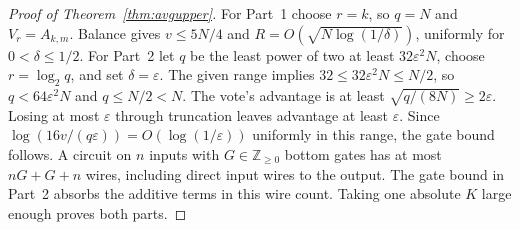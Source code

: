 \documentclass[11pt]{article}
\begin{document}
\begin{proof}[Proof of Theorem~\ref{thm:avgupper}]
For Part~1 choose $r=k$, so $q=N$ and $V_r=A_{k,m}$.
Balance gives $v\le5N/4$ and
$R=O(\sqrt{N\log(1/\delta)})$, uniformly for $0<\delta\le1/2$.
For Part~2 let $q$ be the least power of two at least
$32\varepsilon^2N$, choose $r=\log_2q$, and set $\delta=\varepsilon$.
The given range implies $32\le32\varepsilon^2N\le N/2$, so
$q<64\varepsilon^2N$ and $q\le N/2<N$.
The vote's advantage is at least $\sqrt{q/(8N)}\ge2\varepsilon$.
Losing at most $\varepsilon$ through truncation leaves advantage at least
$\varepsilon$. Since
$\log(16v/(q\varepsilon))=O(\log(1/\varepsilon))$ uniformly in this
range, the gate bound follows.
A circuit on $n$ inputs with $G\in\mathbb Z_{\ge0}$ bottom gates has at
most $nG+G+n$ wires, including direct input wires to the output.
The gate bound in Part~2 absorbs the additive terms in this wire count.
Taking one absolute $K$ large enough proves both parts.
\end{proof}
\end{document}
